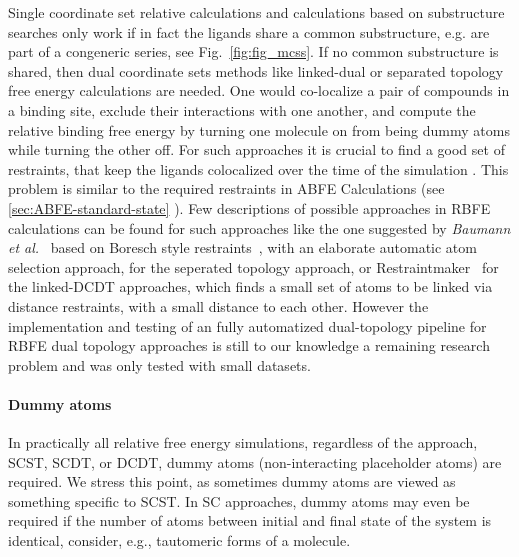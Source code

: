 \documentclass[9pt,bestpractices]{livecoms}
\begin{document}
Single coordinate set relative calculations and calculations based on substructure searches only work if in fact the ligands share a common substructure, e.g. are part of a congeneric series, see Fig.~\ref{fig:fig_mcss}.
If no common substructure is shared, then dual coordinate sets methods like linked-dual or separated topology free energy calculations are needed. One would co-localize a pair of compounds in a binding site, exclude their interactions with one another, and compute the relative binding free energy by turning one molecule on from being dummy atoms while turning the other off.
For such approaches it is crucial to find a good set of restraints, that keep the ligands colocalized over the time of the simulation . This problem is similar to the required restraints in ABFE Calculations (see \ref{sec:ABFE-standard-state} ). Few descriptions of possible approaches in RBFE calculations can be found for such approaches like the one suggested by \textit{Baumann et al.}~\cite{baumann2023broadening} based on Boresch style restraints~\cite{boresch2003absolute}, with an elaborate automatic atom selection approach, for the seperated topology approach, or Restraintmaker~\cite{ries2022restraintmaker} for the linked-DCDT approaches, which finds a small set of atoms to be linked via distance restraints, with a small distance to each other. 
However the implementation and testing of an fully automatized dual-topology pipeline for RBFE dual topology approaches is still to our knowledge a remaining research problem and was only tested with small datasets. \cite{jespers2019qligfep, rieder2022lev}

\paragraph{Dummy atoms} \label{subsec: Dummy Atoms}

In practically all relative free energy simulations, regardless of the approach, SCST, SCDT, or DCDT, dummy atoms (non-interacting placeholder atoms) are required. We stress this point, as sometimes dummy atoms are viewed as something specific to SCST. In SC approaches, dummy atoms may even be required if the number of atoms between initial and final state of the system is identical, consider, e.g., tautomeric forms of a molecule.
\end{document}
